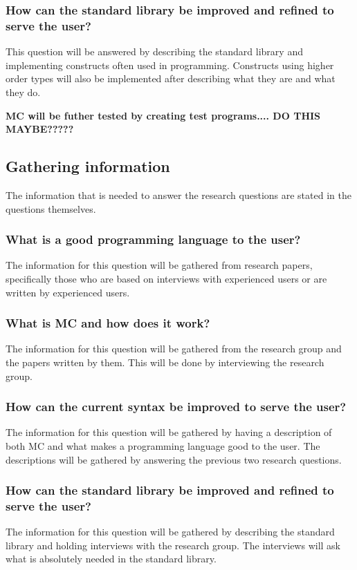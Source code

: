 \subsubsection{How can the standard library be improved and refined to serve the user?}
This question will be answered by describing the standard library and implementing constructs often used in programming.
Constructs using higher order types will also be implemented after describing what they are and what they do.

\textbf{MC will be futher tested by creating test programs.... DO THIS MAYBE?????}


\subsection{Gathering information}
The information that is needed to answer the research questions are stated in the questions themselves.


\subsubsection{What is a good programming language to the user?}
The information for this question will be gathered from research papers, specifically those who are based on interviews with experienced users or are written by experienced users.

\subsubsection{What is MC and how does it work?}
The information for this question will be gathered from the research group and the papers written by them.
This will be done by interviewing the research group.

\subsubsection{How can the current syntax be improved to serve the user?}
The information for this question will be gathered by having a description of both MC and what makes a programming language good to the user.
The descriptions will be gathered by answering the previous two research questions.

\subsubsection{How can the standard library be improved and refined to serve the user?}
The information for this question will be gathered by describing the standard library and holding interviews with the research group.
The interviews will ask what is absolutely needed in the standard library.


